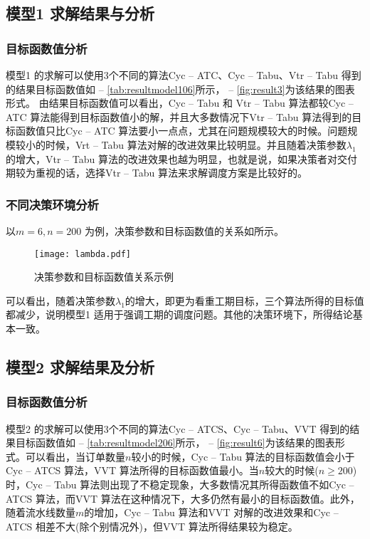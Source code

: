 \subsection{模型1 求解结果与分析}
\subsubsection{目标函数值分析}
模型1 的求解可以使用3个不同的算法Cyc -- ATC、Cyc -- Tabu、Vtr -- Tabu 得到的结果目标函数值如 -- \ref{tab:resultmodel106}所示， -- \ref{fig:result3}为该结果的图表形式。
由结果目标函数值可以看出，Cyc -- Tabu 和 Vtr -- Tabu 算法都较Cyc -- ATC 算法能得到目标函数值小的解，并且大多数情况下Vtr -- Tabu 算法得到的目标函数值只比Cyc -- ATC 算法要小一点点，尤其在问题规模较大的时候。问题规模较小的时候，Vrt -- Tabu 算法对解的改进效果比较明显。并且随着决策参数$\lambda_1$的增大，Vtr -- Tabu 算法的改进效果也越为明显，也就是说，如果决策者对交付期较为重视的话，选择Vtr -- Tabu 算法来求解调度方案是比较好的。
\subsubsection{不同决策环境分析}
以$m = 6, n = 200$ 为例，决策参数和目标函数值的关系如所示。
\begin{figure}
\centering
\texttt{[image: lambda.pdf]}
\caption{决策参数和目标函数值关系示例}\label{fig:decisionvsG}
\end{figure}
可以看出，随着决策参数$\lambda_1$的增大，即更为看重工期目标，三个算法所得的目标值都减少，说明模型1 适用于强调工期的调度问题。其他的决策环境下，所得结论基本一致。
\subsection{模型2 求解结果及分析}
\subsubsection{目标函数值分析}
模型2 的求解可以使用3个不同的算法Cyc -- ATCS、Cyc -- Tabu、VVT 得到的结果目标函数值如 -- \ref{tab:resultmodel206}所示， -- \ref{fig:result6}为该结果的图表形式。可以看出，当订单数量$n$较小的时候，Cyc -- Tabu 算法的目标函数值会小于Cyc -- ATCS 算法，VVT 算法所得的目标函数值最小。当$n$较大的时候($n \ge 200$)时，Cyc -- Tabu 算法则出现了不稳定现象，大多数情况其所得函数值不如Cyc -- ATCS 算法，而VVT 算法在这种情况下，大多仍然有最小的目标函数值。此外，随着流水线数量$m$的增加，Cyc -- Tabu 算法和VVT 对解的改进效果和Cyc -- ATCS 相差不大(除个别情况外)，但VVT 算法所得结果较为稳定。

